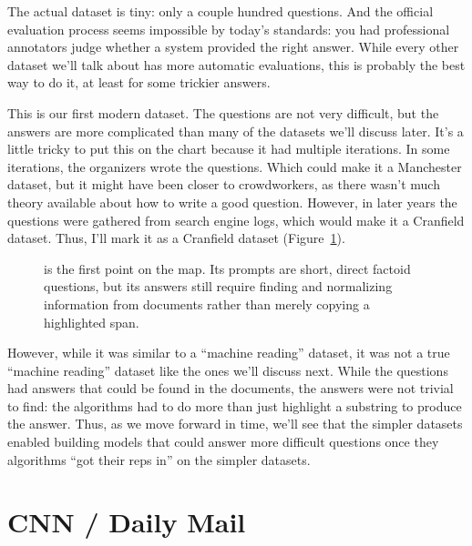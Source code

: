 The actual dataset is tiny: only a couple hundred questions.
%
And the official evaluation process seems impossible by today’s
standards: you had professional annotators judge whether a system
provided the right answer.
%
While every other dataset we’ll talk about has more automatic
evaluations, this is probably the best way to do it, at least for some
trickier answers.

This is our first modern  dataset.  The questions are not very
difficult, but the answers are more complicated than many of the
datasets we'll discuss later.
%
It's a little tricky to put this on the chart because it had multiple
iterations.  In some iterations, the organizers wrote the questions.
Which could make it a Manchester dataset, but it might have been
closer to crowdworkers, as there wasn't much theory available about
how to write a good question.
%
However, in later years the questions were gathered from search engine
logs, which would make it a Cranfield dataset.
%
Thus, I'll mark it as a Cranfield dataset (Figure~\ref{fig:datasets-plot-trec}).

\begin{figure}
\centering
{}
\caption{\trecqa{} is the first point on the map.  Its prompts are short,
  direct factoid questions, but its answers still require finding and
  normalizing information from documents rather than merely copying a
  highlighted span.}
\label{fig:datasets-plot-trec}
\end{figure}

However, while it was similar to a ``machine reading'' dataset, it was
not a true ``machine reading'' dataset like the ones we'll discuss
next.
%
While the questions had answers that could be found in the documents,
the answers were not trivial to find: the algorithms had to do more
than just highlight a substring to produce the answer.
%
Thus, as we move forward in time, we'll see that the simpler datasets
enabled building models that could answer more difficult questions
once they algorithms ``got their reps in'' on the simpler datasets.

\section{CNN / Daily Mail}

